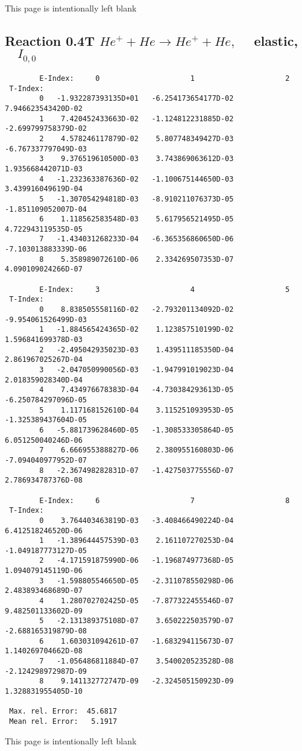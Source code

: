 \newpage
This page is intentionally left blank
\newpage


\subsection{
Reaction 0.4T  $He^+ + He \rightarrow He^+ + He ,\quad$
 elastic, $\quad I_{0,0}$
}

\begin{verbatim}
        E-Index:     0                     1                     2
 T-Index:
        0   -1.932287393135D+01   -6.254173654177D-02    7.946623543420D-02
        1    7.420452433663D-02   -1.124812231885D-02   -2.699799758379D-02
        2    4.578246117879D-02    5.807748349427D-03   -6.767337797049D-03
        3    9.376519610500D-03    3.743869063612D-03    1.935668442071D-03
        4   -1.232363387636D-02   -1.100675144650D-03    3.439916049619D-04
        5   -1.307054294818D-03   -8.910211076373D-05   -1.851109052007D-04
        6    1.118562583548D-03    5.617956521495D-05    4.722943119535D-05
        7   -1.434031268233D-04   -6.365356860650D-06   -7.103013883339D-06
        8    5.358989072610D-06    2.334269507353D-07    4.090109024266D-07

        E-Index:     3                     4                     5
 T-Index:
        0    8.838505558116D-02   -2.793201134092D-02   -9.954061526499D-03
        1   -1.884565424365D-02    1.123857510199D-02    1.596841699378D-03
        2   -2.495042935023D-03    1.439511185350D-04    2.861967025267D-04
        3   -2.047050990056D-03   -1.947991019023D-04    2.018359028340D-04
        4    7.434976678383D-04   -4.730384293613D-05   -6.250784297096D-05
        5    1.117168152610D-04    3.115251093953D-05   -1.325389437604D-05
        6   -5.881739628460D-05   -1.308533305864D-05    6.051250040246D-06
        7    6.666955388827D-06    2.380955160803D-06   -7.094040977952D-07
        8   -2.367498282831D-07   -1.427503775556D-07    2.786934787376D-08

        E-Index:     6                     7                     8
 T-Index:
        0    3.764403463819D-03   -3.408466490224D-04    6.412518246520D-06
        1   -1.389644457539D-03    2.161107270253D-04   -1.049187773127D-05
        2   -4.171591875990D-06   -1.196874977368D-05    1.094079145119D-06
        3   -1.598805546650D-05   -2.311078550298D-06    2.483893468689D-07
        4    1.280702702425D-05   -7.877322455546D-07    9.482501133602D-09
        5   -2.131389375108D-07    3.650222503579D-07   -2.688165319879D-08
        6    1.603031094261D-07   -1.683294115673D-07    1.140269704662D-08
        7   -1.056486811884D-07    3.540020523528D-08   -2.124298972987D-09
        8    9.141132772747D-09   -2.324505150923D-09    1.328831955405D-10

 Max. rel. Error:  45.6817
 Mean rel. Error:   5.1917
\end{verbatim}
\newpage
This page is intentionally left blank
\newpage

